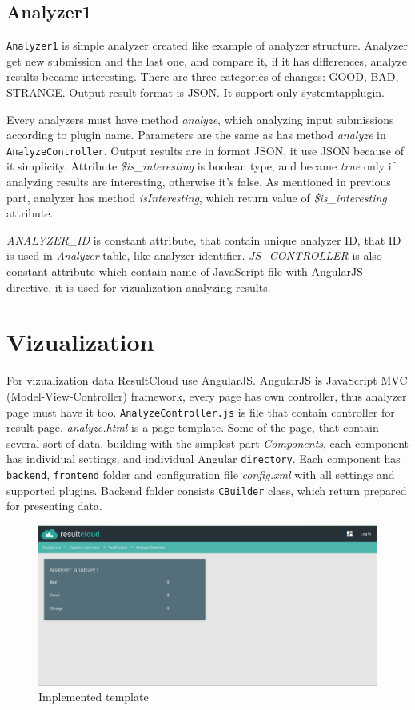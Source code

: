 \subsection{Analyzer1}

\texttt{Analyzer1} is simple analyzer created like example of analyzer structure. Analyzer get new submission and the last one, and compare it, if it has differences, analyze results became interesting. There are three categories of changes: GOOD, BAD, STRANGE. Output result format is JSON. It support only \"systemtap\" plugin.

Every analyzers must have method \emph{analyze}, which analyzing input submissions according to plugin name. Parameters are the same as has method \emph{analyze} in \texttt{AnalyzeController}. Output results are in format JSON, it use JSON because of it simplicity. Attribute \emph{\$is\_interesting} is boolean type, and became \emph{true} only if analyzing results are interesting, otherwise it's false. As mentioned in previous part, analyzer has method \emph{isInteresting}, which return value of \emph{\$is\_interesting} attribute.

\emph{ANALYZER\_ID} is constant attribute, that contain unique analyzer ID, that ID is used in \emph{Analyzer} table, like analyzer identifier. \emph{JS\_CONTROLLER} is also constant attribute which contain name of JavaScript file with AngularJS directive, it is used for vizualization analyzing results.

\section{Vizualization}

For vizualization data ResultCloud use AngularJS. AngularJS is JavaScript MVC (Model-View-Controller) framework, every page has own controller, thus analyzer page must have it too. \texttt{AnalyzeController.js} is file that contain controller for result page. \emph{analyze.html} is a page template. Some of the page, that contain several sort of data, building with the simplest part \emph{Components}, each component has individual settings, and individual Angular \texttt{directory}. Each component has \texttt{backend}, \texttt{frontend} folder and configuration file \emph{config.xml} with all settings and supported plugins. Backend folder consists \texttt{CBuilder} class, which return prepared for presenting data. 

\begin{figure}
  \centering
    \includegraphics[scale=0.3]{fig/temp_res.png}
  \caption{Implemented template}
  \label{fig:temp_res}
\end{figure}

